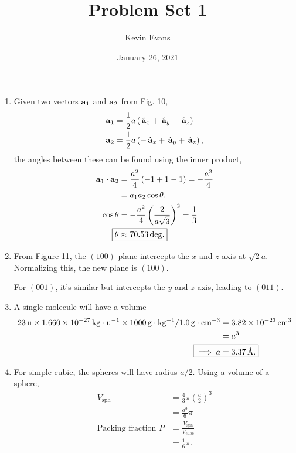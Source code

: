\documentclass{homework}
\title{Problem Set 1}
\author{Kevin Evans}
\date{January 26, 2021}
\begin{document}
	\maketitle
	\begin{enumerate}
		\item %
			Given two vectors $\boldsymbol{\mathrm{a}}_1$ and $\boldsymbol{\mathrm{a}}_2$ from Fig. 10, \begin{align*}
				\boldsymbol{\mathrm{a}}_1 & = \frac{1}{2} a\left(\thinspace\hat{ \mathbf{a}}_{x} + \thinspace\hat{ \mathbf{a}}_{y} - \thinspace\hat{ \mathbf{a}}_{z}\right) \\
				\boldsymbol{\mathrm{a}}_2 & = \frac{1}{2} a \left(-\thinspace\hat{ \mathbf{a}}_{x} + \thinspace\hat{ \mathbf{a}}_{y} + \thinspace\hat{ \mathbf{a}}_{z}\right),
			\end{align*}
			the angles between these can be found using the inner product, \begin{align*}
				\bvec{a}_1 \cdot \bvec{a}_2 & = \frac{a^2}{4} \left(-1 + 1 - 1\right) = -\frac{a^2}{4} \\
					& = a_1 a_2 \cos \theta. \\
				\cos \theta & = -\frac{a^2}{4} \left(\frac{2}{a\sqrt{3}}\right)^2 = \frac{1}{3} \\
				\Aboxed{ \theta & \approx \SI{70.53}{\deg}. }
			\end{align*}
		
		\item %
			From Figure 11, the $(100)$ plane intercepts the $x$ and $z$ axis at $\sqrt{2}a$. Normalizing this, the new plane is $(100)$.
			
			For $(001)$, it's similar but intercepts the $y$ and $z$ axis, leading to $(011)$.
		
		\item A single  molecule will have a volume \begin{align*}
			\SI{23}{\atomicmassunit} \times \SI{1.660e-27}{\kg \per \atomicmassunit} \times \SI{1000}{\g \per \kg} / \SI{1.0}{\g \per \centi\meter\cubed} & = \SI{3.82e-23}{\centi\meter\cubed} \\
				& = a^3 \\
			\Aboxed{ \implies a & = \SI{3.37}{\angstrom}. }
		\end{align*}
	
		\item %
			For \underline{simple cubic}, the spheres will have radius $a/2$. Using a volume of a sphere, \begin{align*}
				V_\mathrm{sph} & = \frac{4}{3} \pi \left(\frac{a}{2}\right)^3 \\
					& = \frac{a^3}{6} \pi \\
				\text{Packing fraction }  P & = \frac{V_\mathrm{sph}}{V_\mathrm{cube}} \\
					& = \frac{1}{6} \pi. 
			\end{align*}
			

\end{enumerate}
\end{document}
